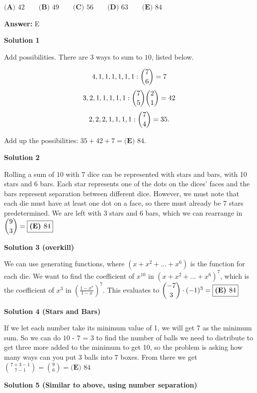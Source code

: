 \begin{enumerate}
 $\textbf{(A) }42\qquad \textbf{(B) }49\qquad \textbf{(C) }56\qquad \textbf{(D) }63\qquad \textbf{(E) }84\qquad$

 \textbf{Answer: }E



\textbf{Solution 1}

Add possibilities. There are $3$ ways to sum to $10$, listed below.

 
 \[4,1,1,1,1,1,1: \dbinom{7}{6} = 7\]
 \[3,2,1,1,1,1,1: \dbinom{7}{5}\dbinom{2}{1} = 42\]
 \[2,2,2,1,1,1,1: \dbinom{7}{4} = 35.\]

 Add up the possibilities: $35+42+7=\boxed{\textbf{(E) }  84}$.

 



\textbf{Solution 2}

Rolling a sum of $10$ with 7 dice can be represented with stars and bars, with 10 stars and 6 bars. Each star represents one of the dots on the dices' faces and the bars represent separation between different dice. However, we must note that each die must have at least one dot on a face, so there must already be 7 stars predetermined. We are left with 3 stars and 6 bars, which we can rearrange in $\dbinom{9}{3}=\boxed{\textbf{(E) } 84}$




\textbf{Solution 3 (overkill)}

We can use generating functions, where $(x+x^2+...+x^6)$ is the function for each die. We want to find the coefficient of $x^{10}$ in $(x+x^2+...+x^6)^7$, which is the coefficient of $x^3$ in $\left(\frac{1-x^7}{1-x}\right)^7$. This evaluates to $\dbinom{-7}{3} \cdot (-1)^3=\boxed{\textbf{(E) }84}$




\textbf{Solution 4 (Stars and Bars)}

If we let each number take its minimum value of 1, we will get 7 as the minimum sum. So we can do $10$ - $7$ = $3$ to find the number of balls we need to distribute to get three more added to the minimum to get 10, so the problem is asking how many ways can you put $3$ balls into $7$ boxes. From there we get $\binom{7+3-1}{7-1}=\binom{9}{6}=\boxed{\textbf{(E) }84}$




\textbf{Solution 5 (Similar to above, using number separation)}


\end{enumerate}
